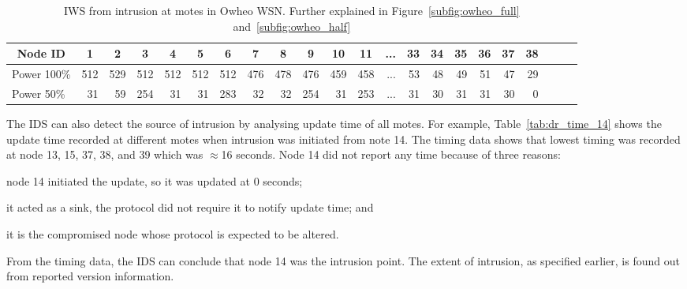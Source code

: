 \documentclass{CRPITStyle}
\newcommand*{\bd}[1]{\multicolumn{1}{|c|}{\bfseries #1}}
\begin{document}
\begin{table}[t!]
\centering
\begin{tabular}{|l|*{20}{r|}r|}
\hline
\bd{Node ID}           & \bd{1} & \bd{2} & \bd{3} & \bd{4} & \bd{5} & \bd{6} & \bd{7} & \bd{8} & \bd{9} & \bd{10} & \bd{11} & \bd{...} & \bd{33} & \bd{34} & \bd{35} & \bd{36} & \bd{37} & \bd{38} \\
\hline		\hline

Power 100\%	   & 512 & 529 & 512 & 512 & 512  & 512 & 476 & 478 & 476 & 459 & 458 & ...& 53  & 48 & 49 & 51 & 47 & 29 \\
\hline

Power 50\%	  &31 & 59&254& 31& 31 &283& 32& 32& 254& 31 &253 & ... & 31  & 30 & 31 & 31 & 30 & 0 \\
\hline
\end{tabular}
\caption{IWS from intrusion at motes in Owheo WSN. Further explained in Figure~\ref{subfig:owheo_full} and~\ref{subfig:owheo_half} }
\label{tab:owheo}
\end{table}


The IDS can also detect the source of intrusion by analysing update time of all motes. %
For example, Table~\ref{tab:dr_time_14} shows the update time recorded at different motes when intrusion was initiated from note 14.
The timing data shows that lowest timing was recorded at node 13, 15, 37, 38, and 39 which was $\approx$16 seconds.
Node 14 did not report any time because of three reasons: 
\begin{inparaenum}
\item node 14 initiated the update, so it was updated at $0$ seconds;
\item it acted as a sink, the protocol did not require it to notify update time; and 
\item it is the compromised node whose protocol is expected to be altered.
\end{inparaenum}
From the timing data, the IDS can conclude that node 14 was the intrusion point.
The extent of intrusion, as specified earlier, is found out from reported version information.
\end{document}
